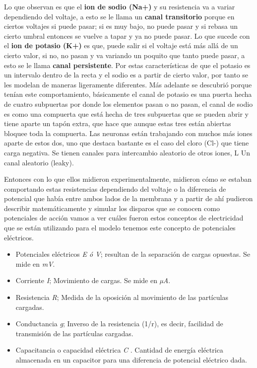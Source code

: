 Lo que observan es que el \textbf{ion de sodio (Na+)} y su resistencia va a variar dependiendo del voltaje, a esto se le llama un \textbf{canal transitorio} porque en ciertos voltajes si puede pasar; si es muy bajo, no puede pasar y si rebasa un cierto umbral entonces se vuelve a tapar y ya no puede pasar. 
Lo que sucede con el \textbf{ion de potasio (K+)} es que, puede salir si el voltaje está más allá de un cierto valor, si no, no pasan y va variando un poquito que tanto puede pasar, a esto se le llama \textbf{canal persistente}. Por estas características de que el potasio es un intervalo dentro de la recta y el sodio es a partir de cierto valor, por tanto se les modelan de maneras ligeramente diferentes. Más adelante se descubrió porque tenían este comportamiento, básicamente el canal de potasio es una puerta hecha de cuatro subpuertas por donde los elementos pasan o no pasan, el canal de sodio es como una compuerta que está hecha de tres subpuertas que se pueden abrir y tiene aparte un tapón extra, que hace que  aunque estas tres están abiertas bloquee toda la compuerta.
Las neuronas están trabajando con muchos más iones aparte de estos dos, uno que destaca bastante es el caso del cloro (Cl-) que tiene carga negativa. Se tienen canales para intercambio aleatorio de otros iones, L Un canal aleatorio (leaky).

Entonces con lo que ellos midieron experimentalmente, midieron cómo se estaban comportando estas resistencias dependiendo del voltaje o la diferencia de potencial que había entre ambos lados de la membrana y a partir de ahí pudieron describir matemáticamente y simular los disparos que se conocen como potenciales de acción vamos a ver cuáles fueron estos conceptos de electricidad que se están utilizando para el modelo tenemos este concepto de potenciales eléctricos.

\begin{itemize}
\item Potenciales eléctricos \emph{E ó  V}; resultan de la separación de cargas opuestas. Se mide en \emph{mV}.
\item Corriente \emph{I}; Movimiento de cargas. Se mide en \emph{µA}.
\item Resistencia \emph{R}; Medida de la oposición al movimiento de las partículas cargadas.
\item Conductancia \emph{g}; Inverso de la resistencia (1/r), es decir, facilidad de transmisión de las partículas cargadas.
\item Capacitancia o capacidad eléctrica \emph{C} . Cantidad de energía eléctrica almacenada en un capacitor para una diferencia de potencial eléctrico dada.
\end{itemize}

